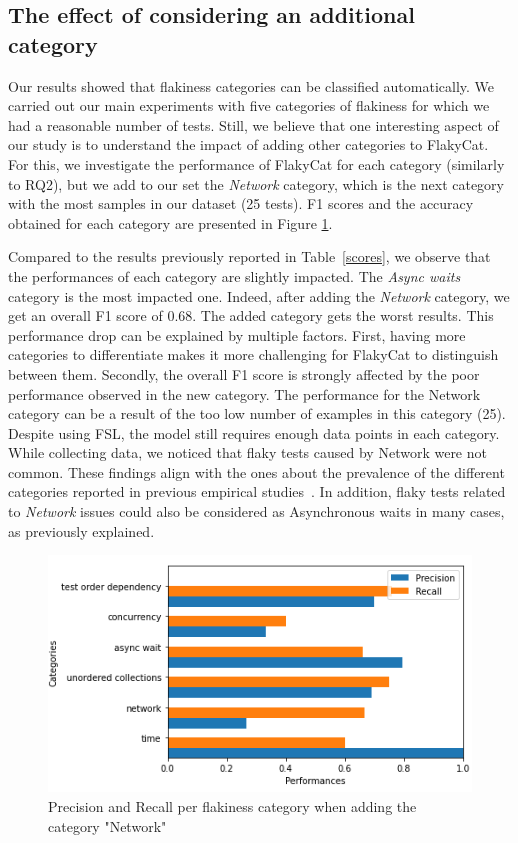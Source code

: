 \subsection{The effect of considering an additional category}
Our results showed that flakiness categories can be classified automatically. We carried out our main experiments with five categories of flakiness for which we had a reasonable number of tests. Still, we believe that one interesting aspect of our study is to understand the impact of adding other categories to FlakyCat. 
For this, we investigate the performance of FlakyCat for each category (similarly to RQ2), but we add to our set the \textit{Network} category,
which is the next category with the most samples in our dataset (25 tests). F1 scores and the accuracy obtained for each category are presented in Figure \ref{fig:fsl_add_class}. 

Compared to the results previously reported in Table~\ref{scores}, we observe that the performances of each category are slightly impacted.
The \textit{Async waits} category is the most impacted one. 
Indeed, after adding the \textit{Network} category, we get an overall F1 score of 0.68. The added category gets the worst results. 
This performance drop can be explained by multiple factors.
First, having more categories to differentiate makes it more challenging for FlakyCat to distinguish between them.
Secondly, the overall F1 score is strongly affected by the poor performance observed in the new category.
The performance for the Network category can be a result of the too low number of examples in this category (25). Despite using FSL, the model still requires enough data points in each category. While collecting data, we noticed that flaky tests caused by Network were not common. These findings align with the ones about the prevalence of the different categories reported in previous empirical studies~\cite{Luo2014,Eck2019}. In addition, flaky tests related to \textit{Network} issues could also be considered as Asynchronous waits in many cases, as previously explained. 


\begin{figure}[htbp]
\centering
\includegraphics[scale=0.8]{figures/flakycat/add_network.PNG}
\caption{Precision and Recall per flakiness category when adding the category "Network" }
\label{fig:fsl_add_class}
\end{figure}